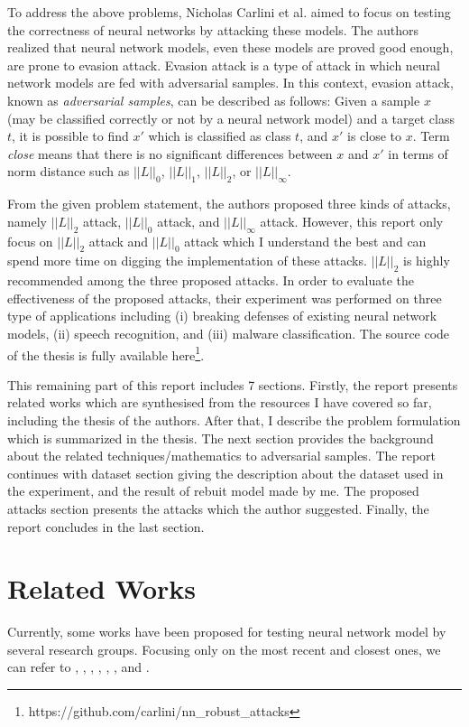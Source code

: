 \documentclass[12pt]{article}
\begin{document}
To address the above problems, Nicholas Carlini et al. aimed to focus on testing the correctness of neural networks by attacking these models. The authors realized that neural network models, even these models are proved good enough, are prone to evasion attack. Evasion attack is a type of attack in which neural network models are fed with adversarial samples. In this context, evasion attack, known as \textit{adversarial samples}, can be described as follows: Given a sample $x$ (may be classified correctly or not by a neural network model) and a target class $t$, it is possible to find $x'$ which is classified as class $t$, and $x'$ is close to $x$. Term \textit{close} means that there is no significant differences between $x$ and $x'$ in terms of norm distance such as $||L||_0$, $||L||_1$, $||L||_2$, or $||L||_\infty$. 

From the given problem statement, the authors proposed three kinds of attacks, namely $||L||_2$ attack, $||L||_0$ attack, and $||L||_\infty$ attack. However, this report only focus on $||L||_2$ attack and $||L||_0$ attack which I understand the best and can spend more time on digging the implementation of these attacks. $||L||_2$ is highly recommended among the three proposed attacks. In order to evaluate the effectiveness of the proposed attacks, their experiment was performed on three type of applications including (i) breaking defenses of existing neural network models, (ii) speech recognition, and (iii) malware classification. The source code of the thesis is fully available here\footnote{https://github.com/carlini/nn\_robust\_attacks}.

This remaining part of this report includes 7 sections. Firstly, the report presents related works which are synthesised from the resources I have covered so far, including the thesis of the authors. After that, I describe the problem formulation which is summarized in the thesis. The next section provides the background about the related techniques/mathematics to adversarial samples. The report continues with dataset section giving the description about the dataset used in the experiment, and the result of rebuit model made by me. The proposed attacks section presents the attacks which the author suggested. Finally, the report concludes in the last section.

\section{Related Works}

Currently, some works have been proposed for testing neural network model by several
research groups. Focusing only on the most recent and closest ones, we can refer to \cite{DeepXplore}, \cite{deep-gauge}, \cite{deepct}, \cite{deeproad}, \cite{deeptest}, \cite{concolic-testing}, and \cite{coverage-limiation}.
\end{document}

